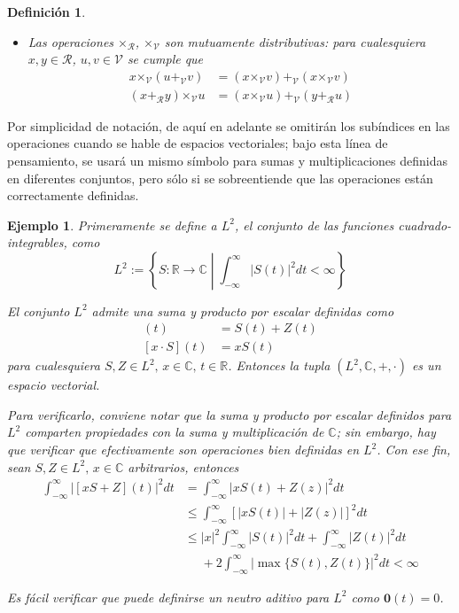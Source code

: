 \documentclass[12pt,letterpaper]{book}
\newtheorem{definicion}{Definición}[chapter]
\newtheorem{ejemplo}{Ejemplo}[chapter]
\newcommand{\R}{\mathbb{R}}
\newcommand{\C}{\mathbb{C}}
\newcommand{\intR}{\int_{-\infty}^{\infty}}
\newcommand{\abso}[1]{\left| #1 \right|}
\newcommand{\talque}{\mathrel{}\middle|\mathrel{}}
\newcommand{\pheq}{\phantom{=}}
\begin{document}
\begin{definicion}
\begin{itemize}
\item Las operaciones $\boldsymbol{\times}_\mathcal{R}$, $\boldsymbol{\times}_\mathcal{V}$ son mutuamente distributivas: para cualesquiera $x, y \in \mathcal{R}$, $u, v \in \mathcal{V}$ se cumple que
\begin{align*}
x \boldsymbol{\times}_\mathcal{V} (u \boldsymbol{+}_\mathcal{V} v) &= (x \boldsymbol{\times}_\mathcal{V} v ) \boldsymbol{+}_\mathcal{V} (x \boldsymbol{\times}_\mathcal{V} v) \\
(x \boldsymbol{+}_\mathcal{R} y) \boldsymbol{\times}_\mathcal{V} u &= (x \boldsymbol{\times}_\mathcal{V} u ) \boldsymbol{+}_\mathcal{V} ( y \boldsymbol{+}_\mathcal{R} u)
\end{align*}
\end{itemize}
\end{definicion}

Por simplicidad de notación, de aquí en adelante se omitirán los subíndices en las operaciones cuando se hable de espacios vectoriales;
bajo esta línea de pensamiento, se usará un mismo símbolo para sumas y multiplicaciones definidas en diferentes conjuntos, pero sólo si se sobreentiende que las operaciones están correctamente definidas.

\begin{ejemplo}
Primeramente se define a $L^2$, el conjunto de las funciones cuadrado-integrables, como
\begin{equation}
L^2 := \left\{ S: \R\rightarrow\C \talque \intR \abso{S(t)}^2 dt < \infty \right\}
\end{equation}

El conjunto $L^2$ admite una suma y producto por escalar definidas como
\begin{align}
[S+Z](t) &= S(t) + Z(t) \\
[x\cdot S](t) &= x S(t)
\end{align}
para cualesquiera $S, Z \in L^{2}, \, x\in \C, \, t\in \R$. 
%
Entonces la tupla $(L^{2}, \C,+,\cdot)$ es un espacio vectorial.

Para verificarlo, conviene notar que la suma y producto por escalar definidos para $L^{2}$ comparten propiedades con la suma y multiplicación de $\C$; sin embargo, hay que verificar que efectivamente son operaciones bien definidas en $L^{2}$.
%
Con ese fin, sean $S, Z \in L^{2}, \, x \in \C$ arbitrarios, entonces
\begin{align*}
\intR \abso{\left[x S + Z\right]\left(t\right)}^2 dt 
&= 
\intR \abso{ xS(t) + Z(z)}^2 dt \\
&\leq
\intR \left[ \abso{ xS(t)} + \abso{ Z(z)} \right]^2 dt \\
&\leq
\abso{x}^{2} \intR \abso{ S(t)}^{2} dt + \intR \abso{ Z(t)}^{2} dt \\
&\pheq
+ 2\intR \abso{ \max\{ S(t), Z(t) \} }^{2} dt < \infty
\end{align*}

Es fácil verificar que puede definirse un neutro aditivo para $L^{2}$ como $\boldsymbol{0}(t) = 0$.
\end{ejemplo}
\end{document}
